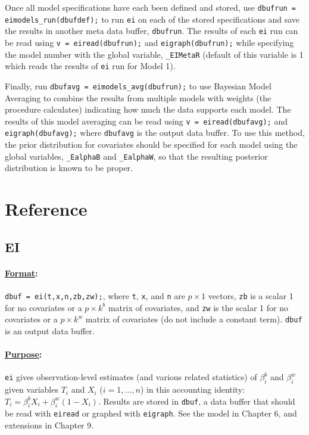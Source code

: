 \documentclass[11pt,titlepage]{article}
\begin{document}
Once all model specifications have each been defined and stored, use
\texttt{dbufrun = eimodels\_run(dbufdef);} to run \texttt{ei} on each
of the stored specifications and save the results in another meta data
buffer, \texttt{dbufrun}. The results of each \texttt{ei} run can be
read using \texttt{v = eiread(dbufrun);} and
\texttt{eigraph(dbufrun);} while specifying the model number with the
global variable, \texttt{_EIMetaR} (default of this variable is 1
which reads the results of \texttt{ei} run for Model 1).

Finally, run \texttt{dbufavg = eimodels\_avg(dbufrun);} to use
Bayesian Model Averaging to combine the results from multiple models
with weights (the procedure calculates) indicating how much the data
supports each model.  The results of this model averaging can be read
using \texttt{v = eiread(dbufavg);} and \texttt{eigraph(dbufavg);}
where \texttt{dbufavg} is the output data buffer. To use this method,
the prior distribution for covariates should be specified for each
model using the global variables, \texttt{\_EalphaB} and
\texttt{\_EalphaW}, so that the resulting posterior distribution is
known to be proper.


\section{Reference}

\subsection{EI} \label{ei}

\paragraph{\underline{Format}:} \texttt{dbuf = ei(t,x,n,zb,zw);}, where
\texttt{t}, \texttt{x}, and \texttt{n} are $p\times 1$ vectors,
\texttt{zb} is a scalar 1 for no covariates or a $p\times k^b$ matrix
of covariates, and \texttt{zw} is the scalar 1 for no covariates or a
$p\times k^w$ matrix of covariates (do not include a constant term).
\texttt{dbuf} is an output data buffer.

\paragraph{\underline{Purpose}:}
\texttt{ei} gives observation-level estimates (and various related
statistics) of $\beta^b_i$ and $\beta_i^w$ given variables $T_i$ and
$X_i$ ($i=1,\dots,n$) in this accounting identity: $T_i = \beta^b_iX_i
+ \beta^w_i(1-X_i)$.  Results are stored in \texttt{dbuf}, a data
buffer that should be read with \texttt{eiread} or graphed with
\texttt{eigraph}.  See the model in Chapter 6, and extensions in
Chapter 9.
\end{document}
